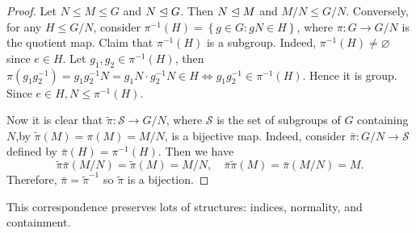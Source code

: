 \documentclass[a4paper]{article}
\begin{document}
\begin{proof}
  Let $ N \le M \le G $ and $ N \trianglelefteq G $. Then $ N \trianglelefteq M $
  and $ M/N \le G/N $. Conversely, for any $ H\le G/N $, consider $
  \pi^{-1}(H)=\left\{ g\in G: gN\in H\right\} $, where $ \pi: G\to
  G/N $ is the quotient map. Claim that $ \pi^{-1}(H) $ is a
  subgroup. Indeed, $\pi^{-1}(H)\neq \varnothing$ since $e\in H$. Let
  $ g_1,g_2\in \pi^{-1}(H) $, then $
  \pi(g_1g_2^{-1})=g_1g_2^{-1}N=g_1N\cdot g_2^{-1}N\in H
  \Leftrightarrow g_1g_2^{-1}\in \pi^{-1}(H) $. Hence it is group.
  Since $ e\in H, N\le \pi^{-1}(H) $.

  Now it is clear that $\tilde{\pi}:\mathcal{S}\to G/N$, where
  $\mathcal{S}$ is the set of subgroups of $G$ containing $N$,by $
  \tilde{\pi}(M)=\pi(M)=M/N$, is a bijective map. Indeed, consider $
  \bar{\pi}:G/N\to \mathcal{S} $ defined by $
  \bar{\pi}(H)=\pi^{-1}(H) $. Then we have
  \[
    \tilde{\pi}\bar{\pi}(M/N)=\tilde{\pi}(M)=M/N,\quad
    \bar{\pi}\tilde{\pi}(M)=\bar{\pi}(M/N)=M
  .\]
  Therefore, $ \bar{\pi}=\tilde{\pi}^{-1} $ so $ \tilde{\pi} $ is a bijection.
\end{proof}
\begin{remark}
  This correspondence preserves lots of structures: indices,
  normality, and containment.
\end{remark}
\newpage
\end{document}
